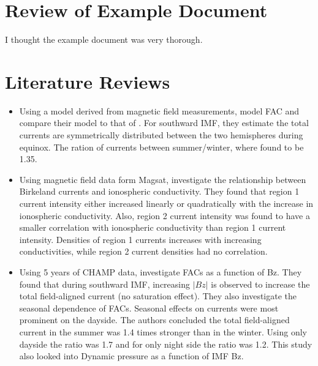 \documentclass[12pt, letterpaper]{article} %
\begin{document}
\section{Review of Example Document} %
I thought the example document was very thorough. 

\section{Literature Reviews}%
\begin{itemize} %
    \item %
    Using a model derived from magnetic field measurements, \cite{papitashvili2002} %
    model FAC and compare their model to that of \cite{weimer2001}. %
    For southward IMF, they estimate the total currents are symmetrically distributed between the two hemispheres during equinox. The ration of currents between summer/winter, where found to be 1.35.
    \item %
    Using magnetic field data form Magsat, \cite{Juusola2009} %
    investigate the relationship between Birkeland currents and ionospheric conductivity. They found that region 1 current intensity either increased linearly or quadratically with the increase in ionospheric conductivity. Also, region 2 current intensity was found to have a smaller correlation with ionospheric conductivity than region 1 current intensity. Densities of region 1 currents increases with increasing conductivities, while region 2 current densities had no correlation. 
    \item %
    Using 5 years of CHAMP data, \cite{fujii1987} %
    investigate FACs as a function of Bz. They found that during southward IMF, increasing $|Bz|$ is observed to increase the total field-aligned current (no saturation effect). They also investigate the seasonal dependence of FACs. Seasonal effects on currents were most prominent on the dayside. The authors concluded the total field-aligned current in the summer was 1.4 times stronger than in the winter. Using only dayside the ratio was 1.7 and for only night side the ratio was 1.2.  This study also looked into Dynamic pressure as a function of IMF Bz. 
\end{itemize} %
\end{document}
